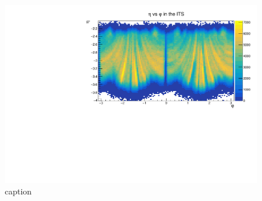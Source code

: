 \begin{figure}[h]
    \begin{center}
        \includegraphics[width=.8\textwidth]{Plots/pass3_MFT/eta_phi_pass3.pdf}
        \caption{caption}
        \label{fig:eta_phi_pass3}
    \end{center}
\end{figure}


